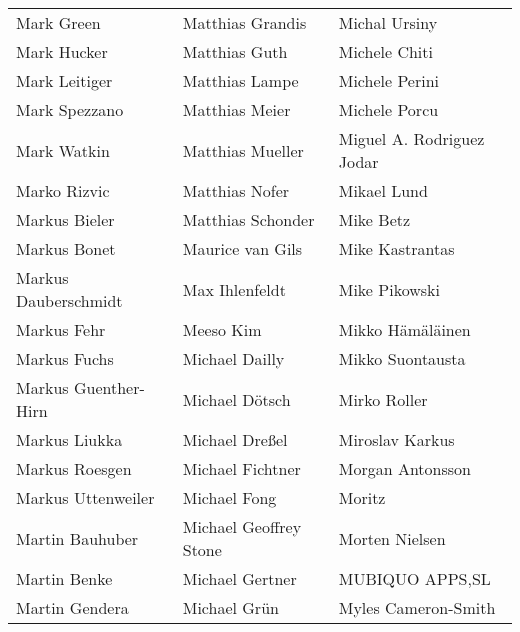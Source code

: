 \begin{tabular}{p{4.5cm}p{4.5cm}p{4.5cm}}
Mark Green & Matthias Grandis & Michal Ursiny \\
Mark Hucker & Matthias Guth & Michele Chiti \\
Mark Leitiger & Matthias Lampe & Michele Perini \\
Mark Spezzano & Matthias Meier & Michele Porcu \\
Mark Watkin & Matthias Mueller & Miguel A. Rodriguez Jodar \\
Marko Rizvic & Matthias Nofer & Mikael Lund \\
Markus Bieler & Matthias Schonder & Mike Betz \\
Markus Bonet & Maurice van Gils & Mike Kastrantas \\
Markus Dauberschmidt & Max Ihlenfeldt & Mike Pikowski \\
Markus Fehr & Meeso Kim & Mikko Hämäläinen \\
Markus Fuchs & Michael Dailly & Mikko Suontausta \\
Markus Guenther-Hirn & Michael Dötsch & Mirko Roller \\
Markus Liukka & Michael Dreßel & Miroslav Karkus \\
Markus Roesgen & Michael Fichtner & Morgan Antonsson \\
Markus Uttenweiler & Michael Fong & Moritz \\
Martin Bauhuber & Michael Geoffrey Stone & Morten Nielsen \\
Martin Benke & Michael Gertner & MUBIQUO APPS,SL \\
Martin Gendera & Michael Grün & Myles Cameron-Smith \\
\end{tabular}
\newpage
\setlength{\tabcolsep}{1mm}
